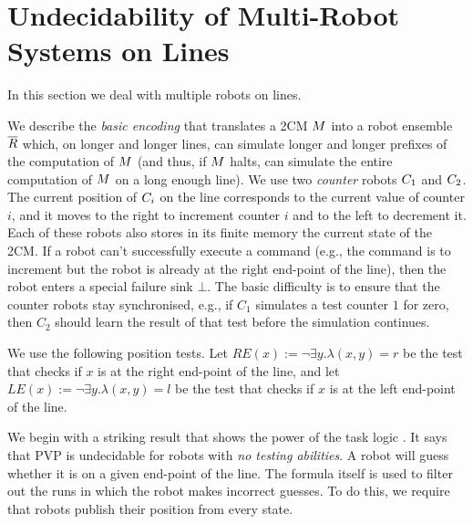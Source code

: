 
\section{Undecidability of Multi-Robot Systems on Lines} \label{sec:PVPundec}

In this section we deal with multiple robots on lines.

We describe the \emph{basic encoding} that translates a 2CM $M$ into a robot ensemble $\overline{R}$ which, on longer and longer lines, can simulate longer and longer prefixes of the computation of $M$ (and thus, if $M$ halts, can simulate the entire computation of $M$ on a long enough line).
We use two \emph{counter} robots $C_1$ and $C_2$. The current position of $C_i$ on the line corresponds to the current value of counter $i$, and it moves to the right to increment counter $i$ and to the left to decrement it.
Each of these robots also stores in its finite memory the current state of the 2CM.
If a robot can't successfully execute a command (e.g., the command is to increment but the robot is already at the right end-point of the line), then the robot enters a special failure sink $\bot$. The basic difficulty is to ensure that the counter robots stay synchronised, e.g., if $C_1$ simulates a test counter $1$ for zero, then $C_2$ should learn the result of that test before the simulation continues.

 We use the following position tests. Let $RE(x) := \neg \exists y. \lambda(x,y) = r$ be the test that checks if $x$ is at the right end-point of the line, 
and let $LE(x) := \neg \exists y. \lambda(x,y) = l$ be the test that checks if $x$ is at the left end-point of the line.

We begin with a striking result that shows the power of the task logic \RLTL. It says that PVP is undecidable for robots with \emph{no testing abilities}. A robot will guess whether it is on a given end-point of the line. The \RLTL formula itself is used to filter out the runs in which the robot makes incorrect guesses. To do this, we require that robots publish their position from every state.



